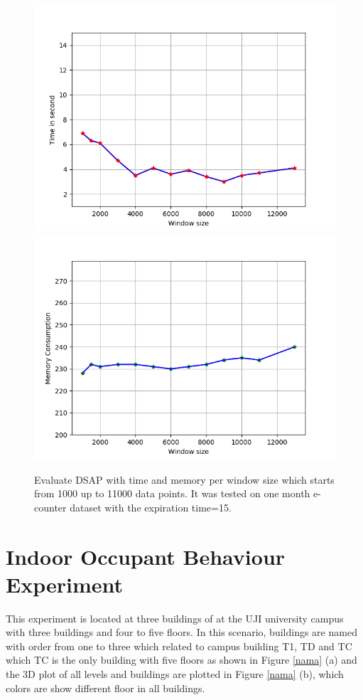 \begin{figure}[!h]
    \centering
    \includegraphics[width = 7.5 cm]{image/Chapters/Chapter6/time.point.lessinitial.png}\hfill
    \includegraphics[width = 7.5 cm]{image/Chapters/Chapter6/mem.point.lessinitial.png}
    \\[\smallskipamount]    
    \caption{ Evaluate DSAP with time and memory per window size which starts from 1000 up to 11000 data points. It was tested on one month e-counter dataset with the expiration time=15.}
    \label{4}
\end{figure}












\section{Indoor Occupant Behaviour Experiment}

This experiment is located at three buildings of at the UJI university campus with three buildings and four to five floors. In this scenario, buildings are named with order from one to three which related to campus building T1, TD and TC which TC is the only building with five floors as shown in Figure \ref{nama} (a) and the 3D plot of all levels and buildings are plotted in Figure \ref{nama} (b), which colors are show different floor in all buildings. 

